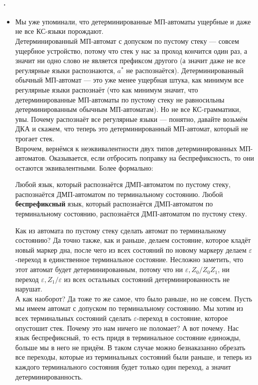 \documentclass{article}
\begin{document}
    \paragraph{.}
    \begin{itemize}
        \item[]
        \begin{Comment}
            Мы уже упоминали, что детерминированные МП-автоматы ущербные и даже не все КС-языки порождают.\\
            Детерминированный МП-автомат с допуском по пустому стеку --- совсем ущербное устройство, потому что стек у нас за проход кончится один раз, а значит ни одно слово не является префиксом другого (а значит даже не все регулярные языки распознаются, $a^*$ не распознаётся). Детерминированный обычный МП-автомат --- это уже менее ущербная штука, как минимум все регулярные языки распознаёт (что как минимум значит, что детерминированные МП-автоматы по пустому стеку не равносильны детерминированным обычным МП-автоматам). Но не все КС-грамматики, увы. Почему распознаёт все регулярные языки --- понятно, давайте возьмём ДКА и скажем, что теперь это детерминированный МП-автомат, который не трогает стек.\\
            Впрочем, вернёмся к неэквивалентности двух типов детерминированных МП-автоматов. Оказывается, если отбросить поправку на беспрефиксность, то они остаются эквивалентными. Более формально:
        \end{Comment}
        \thm Любой язык, который распознаётся ДМП-автоматом по пустому стеку, распознаётся ДМП-автоматом по терминальному состоянию. Любой \textbf{беспрефиксный} язык, который распознаётся ДМП-автоматом по терминальному состоянию, распознаётся ДМП-автоматом по пустому стеку.
        \begin{Proof}
            Как из автомата по пустому стеку сделать автомат по терминальному состоянию? Да точно также, как и раньше, делаем состояние, которое кладёт новый маркер дна, после чего из всех состояний по новому маркеру делаем $\varepsilon$-переход в единственное терминальное состояние. Несложно заметить, что этот автомат будет детерминированным, потому что ни $\varepsilon,Z_0/Z_0Z_1$, ни переход $\varepsilon,Z_1/\varepsilon$ из всех остальных состояний детерминированность не нарушат.\\
            А как наоборот? Да тоже то же самое, что было раньше, но не совсем. Пусть мы имеем автомат с допуском по терминальному состоянию. Мы хотим из всех терминальных состояний сделать $\varepsilon$-переход в состояние, которое опустошит стек. Почему это нам ничего не поломает? А вот почему. Нас язык беспрефиксный, то есть придя в терминальное состояние единожды, больше мы в него не придём. В таком случае можно безнаказанно обрезать все переходы, которые из терминальных состояний были раньше, и теперь из каждого терминального состояния будет только один переход, а значит детерминированность.

\end{Proof}
\end{itemize}
\end{document}
